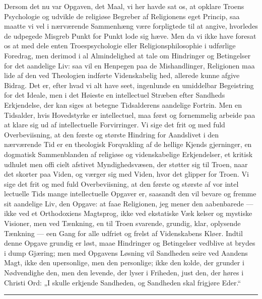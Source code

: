 \documentclass[12pt]{book}
\newcommand{\opage}[1]{\marginnote{\footnotesize\textit{[#1]}}}
\begin{document}
Dersom det nu var Opgaven, det Maal, vi her havde
sat os, at opklare Troens Psychologie og udvikle de
religiøse Begreber af Religionens eget Princip, saa maatte
vi vel i nærværende Sammenhæng være forpligtede til at
angive, hvorledes de udpegede Misgreb Punkt for Punkt
lode sig hæve. Men da vi ikke have foresat os at med\-%
dele enten Troespsychologie eller Religionsphilosophie i
udførlige Foredrag, men derimod i al Almindelighed at
tale om Hindringer og Betingelser for det aandelige Liv:
saa vil en Henpegen paa de Mishandlinger, Religionen
maa lide af den ved Theologien indførte Videnskabelig\-%
hed, allerede kunne afgive Bidrag. Det er, efter hvad
vi alt have seet, ingenlunde en umiddelbar Begeistring
for det Ideale, men i det Høieste en intellectuel Stræben
efter Sandheds Erkjendelse, der kan siges at betegne
\opage{89}\setcounter{footnote}{0}%
Tidsalderens aandelige Fortrin. Men en Tidsalder, hvis
Hovedstyrke er intellectuel, maa først og fornemmelig
arbeide paa at klare sig ud af intellectuelle Forvirringer.
Vi sige det frit og med fuld Overbeviisning, at den første
og største Hindring for Aandslivet i den nærværende
Tid er en theologisk Forqvakling af de hellige Kjends\-%
gjerninger, en dogmatisk Sammenblanden af religiøse og
videnskabelige Erkjendelser, et kritisk udhulet men offi\-%
cielt afstivet Myndighedsvæsen, der støtter sig til Troen,
naar det skorter paa Viden, og værger sig med Viden,
hvor det glipper for Troen. Vi sige det frit og med
fuld Overbeviisning, at den første og største af vor intel\-%
lectuelle Tids mange intellectuelle Opgaver er, saasandt
den vil bevare og fremme sit aandelige Liv, den Opgave:
at faae Religionen, jeg mener den aabenbarede --- ikke ved
et Orthodoxiens Magtsprog, ikke ved ekstatiske Væk\-%
kelser og mystiske Visioner, men ved Tænkning, en til
Troen svarende, grundig, klar, oplysende Tænkning ---
een Gang for alle udfriet og frelst af Videnskabens
Kløer. Indtil denne Opgave grundig er løst, maae
Hindringer og Betingelser vedblive at brydes i dump
Gjæring; men med Opgavens Løsning vil Sandheden
seire ved Aandens Magt, ikke den upersonlige, men den
personlige; ikke den kolde, der grunder i Nødvendighe\-%
den, men den levende, der lyser i Friheden, just den,
der høres i Christi Ord: „I skulle erkjende Sandheden,
og Sandheden skal frigjøre Eder.“

\begin{center}\rule{3cm}{0.4pt}\end{center}
\end{document}
